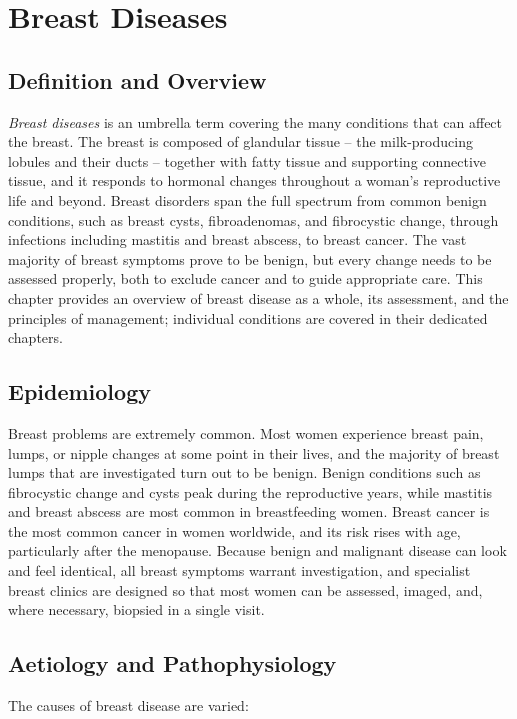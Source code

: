 \chapter{Breast Diseases}

\section*{Definition and Overview}
\emph{Breast diseases} is an umbrella term covering the many conditions that can affect the breast. The breast is composed of glandular tissue -- the milk-producing lobules and their ducts -- together with fatty tissue and supporting connective tissue, and it responds to hormonal changes throughout a woman's reproductive life and beyond. Breast disorders span the full spectrum from common benign conditions, such as breast cysts, fibroadenomas, and fibrocystic change, through infections including mastitis and breast abscess, to breast cancer. The vast majority of breast symptoms prove to be benign, but every change needs to be assessed properly, both to exclude cancer and to guide appropriate care. This chapter provides an overview of breast disease as a whole, its assessment, and the principles of management; individual conditions are covered in their dedicated chapters.

\section*{Epidemiology}
Breast problems are extremely common. Most women experience breast pain, lumps, or nipple changes at some point in their lives, and the majority of breast lumps that are investigated turn out to be benign. Benign conditions such as fibrocystic change and cysts peak during the reproductive years, while mastitis and breast abscess are most common in breastfeeding women. Breast cancer is the most common cancer in women worldwide, and its risk rises with age, particularly after the menopause. Because benign and malignant disease can look and feel identical, all breast symptoms warrant investigation, and specialist breast clinics are designed so that most women can be assessed, imaged, and, where necessary, biopsied in a single visit.

\section*{Aetiology and Pathophysiology}
The causes of breast disease are varied:

